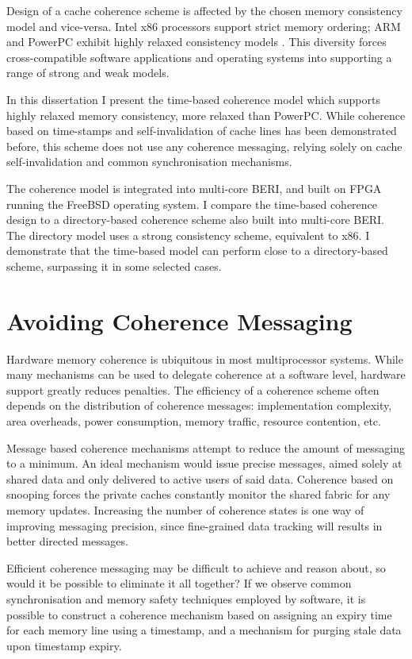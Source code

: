 		Design of a cache coherence scheme is affected by the chosen memory consistency model and vice-versa. Intel x86 processors support strict memory ordering; ARM and PowerPC exhibit highly relaxed consistency models \cite{Maranget12}. This diversity forces cross-compatible software applications and operating systems into supporting a range of strong and weak models. 
		
		In this dissertation I present the time-based coherence model which supports highly relaxed memory consistency, more relaxed than PowerPC. While coherence based on time-stamps and self-invalidation of cache lines has been demonstrated before, this scheme does not use any coherence messaging, relying solely on cache self-invalidation and common synchronisation mechanisms. 
		
		The coherence model is integrated into multi-core BERI, and built on FPGA running the FreeBSD operating system. I compare the time-based coherence design to a directory-based coherence scheme also built into multi-core BERI. The directory model uses a strong consistency scheme, equivalent to x86. I demonstrate that the time-based model can perform close to a directory-based scheme, surpassing it in some selected cases.

	\section{Avoiding Coherence Messaging}
		Hardware memory coherence is ubiquitous in most multiprocessor systems. While many mechanisms can be used to delegate coherence at a software level, hardware support greatly reduces penalties. 
		The efficiency of a coherence scheme often depends on the distribution of coherence messages: implementation complexity, area overheads, power consumption, memory traffic, resource contention, etc. 
		
		Message based coherence mechanisms attempt to reduce the amount of messaging to a minimum. An ideal mechanism would issue precise messages, aimed solely at shared data and only delivered to active users of said data. 
		Coherence based on snooping forces the private caches constantly monitor the shared fabric for any memory updates. 
		Increasing the number of coherence states is one way of improving messaging precision, since fine-grained data tracking will results in better directed messages.
		
		Efficient coherence messaging may be difficult to achieve and reason about, so would it be possible to eliminate it all together? If we observe common synchronisation and memory safety techniques employed by software, it is possible to construct a coherence mechanism based on assigning an expiry time for each memory line using a timestamp, and a mechanism for purging stale data upon timestamp expiry.
		
